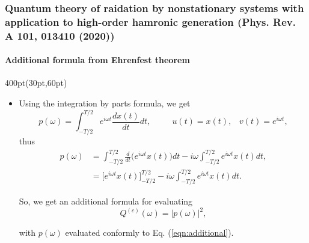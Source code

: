 \begin{frame}
\frametitle{Quantum theory of raidation by nonstationary systems 
	with application to high-order hamronic generation
        (Phys. Rev. A 101, 013410 (2020))}
	\framesubtitle{Additional formula from Ehrenfest theorem}

\begin{textblock*}{400pt}(30pt,60pt)
\footnotesize
\begin{itemize}
\item  Using the integration by parts formula, we get
\begin{equation}
   p(\omega) = \int_{-T/2}^{T/2} e^{i\omega t} \frac{dx(t)}{dt}dt,\hspace{30pt}
   u(t) = x(t),\;\;\; v(t) = e^{i\omega t},
\end{equation}
\noindent thus
\begin{align}
   p(\omega) & = \int_{-T/2}^{T/2} \frac{d}{dt}\Big(e^{i\omega t}x(t)\Big)dt
    -i\omega \int_{-T/2}^{T/2} e^{i\omega t}x(t)dt, \\
             & = \Bigg[ e^{i\omega t} x(t)\Bigg]_{-T/2}^{T/2}
               -i\omega \int_{-T/2}^{T/2} e^{i\omega t}x(t)dt. 
\label{eqn:additional}
\end{align}

So, we get an additional formula for evaluating 
\begin{equation}
Q^{(c)}(\omega) = \left| p(\omega) \right|^2,
\end{equation}

\noindent with $p(\omega)$ evaluated conformly to Eq. (\ref{eqn:additional}).



\end{itemize}
\end{textblock*}



\end{frame}






